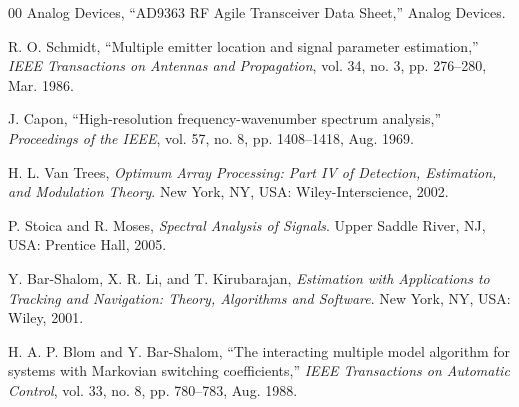 \documentclass[conference]{IEEEtran}
\begin{document}
\begin{thebibliography}{00}
Analog Devices, ``AD9363 RF Agile Transceiver Data Sheet,'' Analog Devices.

R. O. Schmidt, ``Multiple emitter location and signal parameter estimation,'' \textit{IEEE Transactions on Antennas and Propagation}, vol. 34, no. 3, pp. 276--280, Mar. 1986.

J. Capon, ``High-resolution frequency-wavenumber spectrum analysis,'' \textit{Proceedings of the IEEE}, vol. 57, no. 8, pp. 1408--1418, Aug. 1969.

H. L. Van Trees, \textit{Optimum Array Processing: Part IV of Detection, Estimation, and Modulation Theory}. New York, NY, USA: Wiley-Interscience, 2002.

P. Stoica and R. Moses, \textit{Spectral Analysis of Signals}. Upper Saddle River, NJ, USA: Prentice Hall, 2005.

Y. Bar-Shalom, X. R. Li, and T. Kirubarajan, \textit{Estimation with Applications to Tracking and Navigation: Theory, Algorithms and Software}. New York, NY, USA: Wiley, 2001.

H. A. P. Blom and Y. Bar-Shalom, ``The interacting multiple model algorithm for systems with Markovian switching coefficients,'' \textit{IEEE Transactions on Automatic Control}, vol. 33, no. 8, pp. 780--783, Aug. 1988.
\end{thebibliography}
\end{document}
